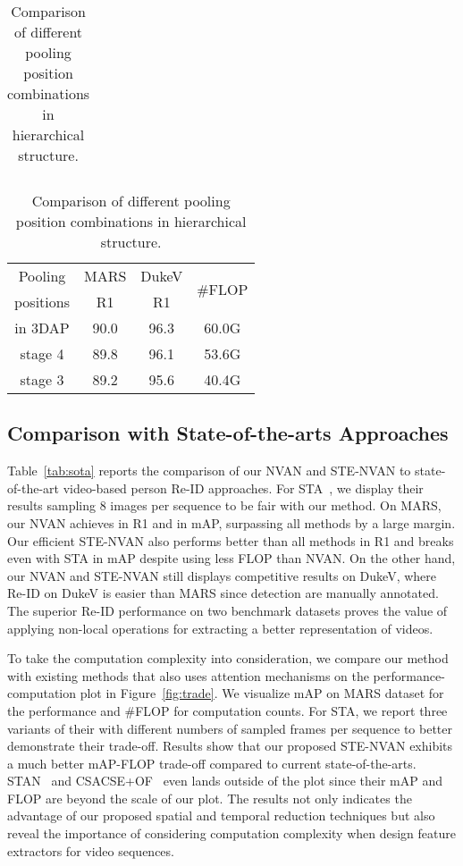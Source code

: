 \documentclass{bmvc2k}
\begin{document}
\begin{table}[t]
\begin{minipage}{.5\linewidth}
\begin{tabular}{c|c|c|c}
        \hline
        \end{tabular}
        \label{tab:n_stripe}
        \caption{Comparison of different pooling position combinations in hierarchical structure.}
        \begin{tabular}{c|c|c|c}
        \hline
        Pooling & MARS & DukeV&\multirow{2}{*}{\#FLOP}\\
        \cline{2-3}
        positions & R1  & R1  &       \\ 
        \hline \hline
        in 3DAP    & 90.0          & 96.3      &  60.0G  \\
        stage 4   &  89.8      & 96.1 &  53.6G \\ 
        stage 3   &  89.2      &  95.6    &   40.4G \\ 
        \hline
        \end{tabular}
        \label{tab:pool_pos}
    \end{minipage} 
    \vspace{-5mm}
\end{table}

\subsection{Comparison with State-of-the-arts Approaches}
Table~\ref{tab:sota} reports the comparison of our NVAN and STE-NVAN to state-of-the-art video-based person Re-ID approaches. 
For STA~\cite{sta}, we display their results sampling 8 images per sequence to be fair with our method.
On MARS, our NVAN achieves  in R1 and  in mAP, surpassing all methods by a large margin.
Our efficient STE-NVAN also performs better than all methods in R1 and breaks even with STA in mAP despite using less FLOP than NVAN.
On the other hand, our NVAN and STE-NVAN still displays competitive results on DukeV, where Re-ID on DukeV is easier than MARS since detection are manually annotated.
The superior Re-ID performance on two benchmark datasets proves the value of applying non-local operations for extracting a better representation of videos. 


To take the computation complexity into consideration, we compare our method with existing methods that also uses attention mechanisms on the performance-computation plot in Figure~\ref{fig:trade}. We visualize mAP on MARS dataset for the performance and \#FLOP for computation counts.
For STA, we report three variants of their with different numbers of sampled frames per sequence to better demonstrate their trade-off.
Results show that our proposed STE-NVAN exhibits a much better mAP-FLOP trade-off compared to current state-of-the-arts.
STAN~\cite{diversity} and CSACSE+OF~\cite{snip} even lands outside of the plot since their mAP and FLOP are beyond the scale of our plot.
The results not only indicates the advantage of our proposed spatial and temporal reduction techniques but also reveal the importance of considering computation complexity when design feature extractors for video sequences.
\end{document}
